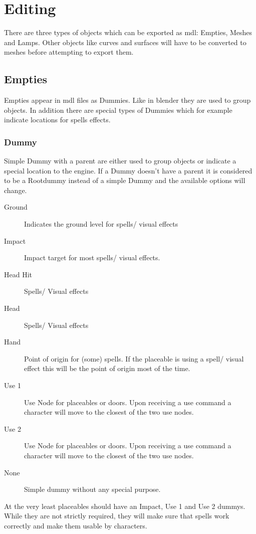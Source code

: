 \section{Editing}
There are three types of objects which can be exported as mdl: Empties,
Meshes and Lamps. Other objects like curves and surfaces will have to be
converted to meshes before attempting to export them.

\subsection{Empties}
Empties appear in mdl files as Dummies. Like in blender they are used to group
objects. In addition there are special types of Dummies which for
example indicate locations for spells effects.

\subsubsection{Dummy}
Simple Dummy with a parent are either used to group objects or indicate a
special location to the engine. If a Dummy doesn't have a parent it is
considered to be a Rootdummy instead of a simple Dummy and the available
options will change.
\begin{description}
    \item[Ground] Indicates the ground level for spells/ visual effects
    \item[Impact] Impact target for most spells/ visual effects.
    \item[Head Hit] Spells/ Visual effects
    \item[Head] Spells/ Visual effects
    \item[Hand] Point of origin for (some) spells. If the placeable is using a spell/ visual effect this will be the point of origin most of the time.
    \item[Use 1] Use Node for placeables or doors. Upon receiving a use command a character will move to the closest of the two use nodes.
    \item[Use 2] Use Node for placeables or doors. Upon receiving a use command a character will move to the closest of the two use nodes.
    \item[None] Simple dummy without any special purpose.
\end{description}
At the very least placeables should have an Impact, Use 1 and Use 2 dummys.
While they are not strictly required, they will make sure that spells
work correctly and make them usable by characters.

